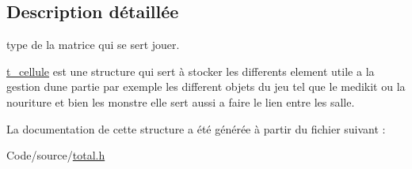 \subsection{Description détaillée}
type de la matrice qui se sert jouer. 

\hyperlink{structt__cellule}{t\+\_\+cellule} est une structure qui sert à stocker les differents element utile a la gestion d\textquotesingle{}une partie par exemple les different objets du jeu tel que le medikit ou la nouriture et bien les monstre elle sert aussi a faire le lien entre les salle. 

La documentation de cette structure a été générée à partir du fichier suivant \+:\begin{DoxyCompactItemize}
\item 
Code/source/\hyperlink{total_8h}{total.\+h}\end{DoxyCompactItemize}
